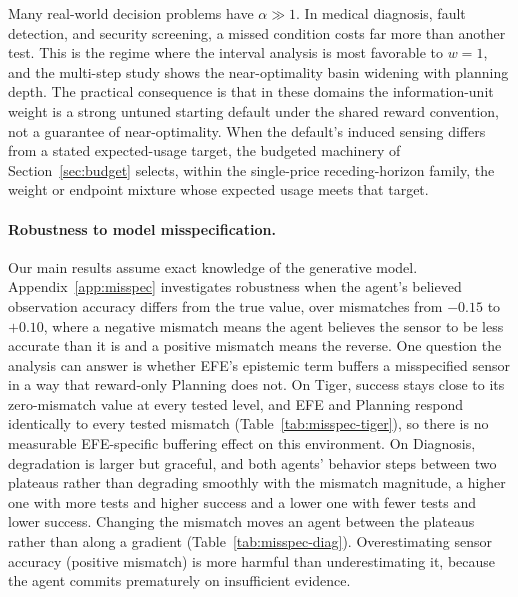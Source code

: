 Many real-world decision problems have $\alpha \gg 1$. In medical diagnosis, fault detection, and security screening, a missed condition costs far more than another test. This is the regime where the interval analysis is most favorable to $w{=}1$, and the multi-step study shows the near-optimality basin widening with planning depth. The practical consequence is that in these domains the information-unit weight is a strong untuned starting default under the shared reward convention, not a guarantee of near-optimality. When the default's induced sensing differs from a stated expected-usage target, the budgeted machinery of Section~\ref{sec:budget} selects, within the single-price receding-horizon family, the weight or endpoint mixture whose expected usage meets that target.

\paragraph{Robustness to model misspecification.}
Our main results assume exact knowledge of the generative model. Appendix~\ref{app:misspec} investigates robustness when the agent's believed observation accuracy differs from the true value, over mismatches from $-0.15$ to $+0.10$, where a negative mismatch means the agent believes the sensor to be less accurate than it is and a positive mismatch means the reverse. One question the analysis can answer is whether EFE's epistemic term buffers a misspecified sensor in a way that reward-only Planning does not. On Tiger, success stays close to its zero-mismatch value at every tested level, and EFE and Planning respond identically to every tested mismatch (Table~\ref{tab:misspec-tiger}), so there is no measurable EFE-specific buffering effect on this environment. On Diagnosis, degradation is larger but graceful, and both agents' behavior steps between two plateaus rather than degrading smoothly with the mismatch magnitude, a higher one with more tests and higher success and a lower one with fewer tests and lower success. Changing the mismatch moves an agent between the plateaus rather than along a gradient (Table~\ref{tab:misspec-diag}). Overestimating sensor accuracy (positive mismatch) is more harmful than underestimating it, because the agent commits prematurely on insufficient evidence.

